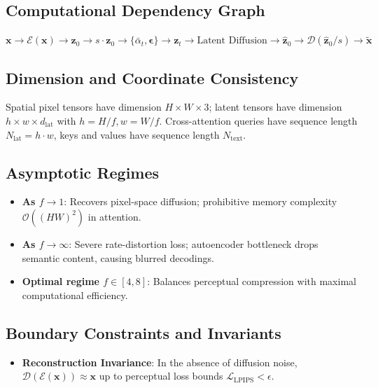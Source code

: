 \documentclass[11pt,a4paper]{article}
\theoremstyle{definition}
\begin{document}
\subsection{Computational Dependency Graph}
{\centering
$\mathbf{x} \longrightarrow \mathcal{E}(\mathbf{x}) \longrightarrow \mathbf{z}_0 \longrightarrow s \cdot \mathbf{z}_0 \longrightarrow \{\bar{\alpha}_t, \boldsymbol{\epsilon}\} \longrightarrow \mathbf{z}_t \longrightarrow \text{Latent Diffusion} \longrightarrow \hat{\mathbf{z}}_0 \longrightarrow \mathcal{D}(\hat{\mathbf{z}}_0 / s) \longrightarrow \tilde{\mathbf{x}}$
\par}

\subsection{Dimension and Coordinate Consistency}
Spatial pixel tensors have dimension $H \times W \times 3$; latent tensors have dimension $h \times w \times d_{\text{lat}}$ with $h = H/f, w = W/f$. Cross-attention queries have sequence length $N_{\text{lat}} = h \cdot w$, keys and values have sequence length $N_{\text{text}}$.

\subsection{Asymptotic Regimes}
\begin{itemize}
    \item \textbf{As $f \to 1$}: Recovers pixel-space diffusion; prohibitive memory complexity $\mathcal{O}((HW)^2)$ in attention.
    \item \textbf{As $f \to \infty$}: Severe rate-distortion loss; autoencoder bottleneck drops semantic content, causing blurred decodings.
    \item \textbf{Optimal regime $f \in [4, 8]$}: Balances perceptual compression with maximal computational efficiency.
\end{itemize}

\subsection{Boundary Constraints and Invariants}
\begin{itemize}
    \item \textbf{Reconstruction Invariance}: In the absence of diffusion noise, $\mathcal{D}(\mathcal{E}(\mathbf{x})) \approx \mathbf{x}$ up to perceptual loss bounds $\mathcal{L}_{\text{LPIPS}} < \epsilon$.
\end{itemize}
\end{document}
